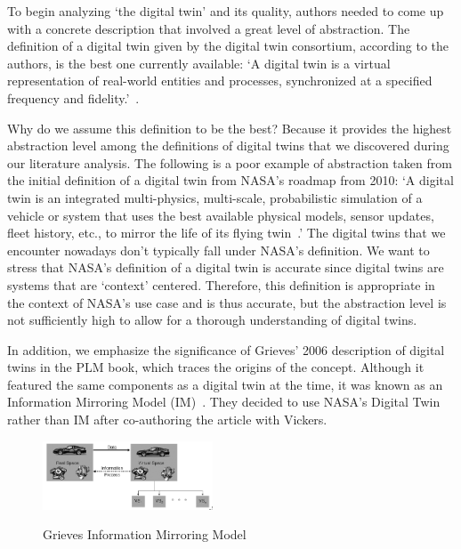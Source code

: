 \documentclass{llncs}
\begin{document}
    To begin analyzing `the digital twin' and its quality, authors needed to come up with a concrete description that involved a great level of abstraction. 
    The definition of a digital twin given by the digital twin consortium, according to the authors, is the best one currently available: `A digital twin is a virtual representation of real-world entities and processes, synchronized at 
    a specified frequency and fidelity.'~\cite{digitaltwinconsortium2022}.

    Why do we assume this definition to be the best? Because it provides the highest abstraction level among the definitions of digital twins that we discovered during our literature analysis. The following is a poor example of abstraction taken from the initial definition of a digital twin from NASA's roadmap from 2010: `A digital twin is an integrated multi-physics, multi-scale, probabilistic simulation of a 
    vehicle or system that uses the best available physical models, sensor updates, fleet history, etc., to mirror the life of its flying twin~\cite{NASA}.'
    The digital twins that we encounter nowadays don't typically fall under NASA's definition. We want to stress that NASA's definition of a  digital twin is accurate since digital twins are systems that are `context' centered. 
    Therefore, this definition is appropriate in the context of NASA's use case and is thus accurate, but the abstraction level is not sufficiently high to allow for a thorough understanding of digital twins.

    In addition, we emphasize the significance of Grieves' 2006 description of digital twins in the PLM book,
    which traces the origins of the concept. Although it featured the same components as a digital twin at the time, it was known as an Information Mirroring Model (IM)~\cite{GrievesPLMBook}. 
    They decided to use NASA's Digital Twin rather than IM after co-authoring the article with Vickers.

    \begin{figure}
        \centering
        \includegraphics[width =0.45\textwidth]{GrievesInformationMirroringModel.png}
        \caption{Grieves Information Mirroring Model}\label{fig:GrievesInformationMirroringModel}
       \cite{GrievesPLMBook}
    \end{figure}
\end{document}
